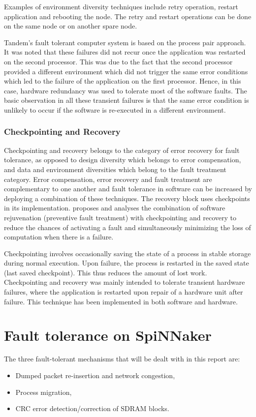 \documentclass[a4paper, 11pt]{article}
\begin{document}
Examples of environment diversity techniques include retry operation, restart application and rebooting the node. The retry and restart operations can be done on the same node or on another spare node.

Tandem's fault tolerant computer system \citep{lee1995software} is based on the process pair approach. It was noted that these failures did not recur once the application was restarted on the second processor. This was due to the fact that the second processor provided a different environment which did not trigger the same error conditions which led to the failure of the application on the first processor. Hence, in this case, hardware redundancy was used to tolerate most of the software faults. The basic observation in all these transient failures is that the same error condition is unlikely to occur if the software is re-executed in a different environment.

\subsubsection{Checkpointing and Recovery}
Checkpointing and recovery \citep{kulkarni1990effects} belongs to the category of error recovery for fault tolerance, as opposed to design diversity which belongs to error compensation, and data and environment diversities which belong to the fault treatment category. Error compensation, error recovery and fault treatment are complementary to one another and fault tolerance in software can be increased by deploying a combination of these techniques. The recovery block uses checkpoints in its implementation. \citet{garg1996minimizing} proposes and analyses the combination of software rejuvenation (preventive fault treatment) with checkpointing and recovery to reduce the chances of activating a fault and simultaneously minimizing the loss of computation when there is a failure.

Checkpointing involves occasionally saving the state of a process in stable storage during normal execution. Upon failure, the process is restarted in the saved state (last saved checkpoint). This thus reduces the amount of lost work. Checkpointing and recovery was mainly intended to tolerate transient hardware failures, where the application is restarted upon repair of a hardware unit after failure. This technique has been implemented in both software and hardware.

\clearpage
\section{Fault tolerance on SpiNNaker}
The three fault-tolerant mechanisms that will be dealt with in this report are:
\begin{itemize}
\item Dumped packet re-insertion and network congestion,
\item Process migration,
\item CRC error detection/correction of SDRAM blocks.
\end{itemize}
\end{document}
